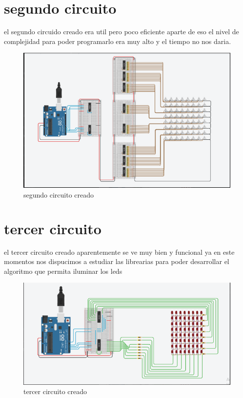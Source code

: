\documentclass{article}
\begin{document}
\section{segundo circuito}
el segundo circuido creado era util pero poco eficiente aparte de eso el nivel de complejidad para poder programarlo era muy alto y el tiempo no nos daria.
\begin{figure}[h!]
\centering
\includegraphics[scale=0.2]{circuito2.PNG}
\caption{segundo circuito creado}
\label{fig:universe}
\end{figure}
\section{tercer circuito}
el tercer circuito creado aparentemente se ve muy bien y funcional ya en este momentos nos dispucimos a estudiar las librearias para poder desarrollar el algoritmo que permita iluminar los leds
\begin{figure}[h!]
\centering
\includegraphics[scale=0.2]{circuito3.PNG}
\caption{tercer circuito creado}
\label{fig:universe}
\end{figure}
\end{document}

